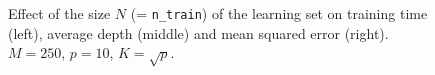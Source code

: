 \begin{figure}
\hspace{-4cm}
\caption{Effect of the size $N$ (= \texttt{n\_train}) of the learning set on training time (left), average depth (middle) and mean squared error (right). $M=250$, $p=10$, $K=\sqrt{p}$.}
\label{fig:5:artificial:N}
\end{figure}

